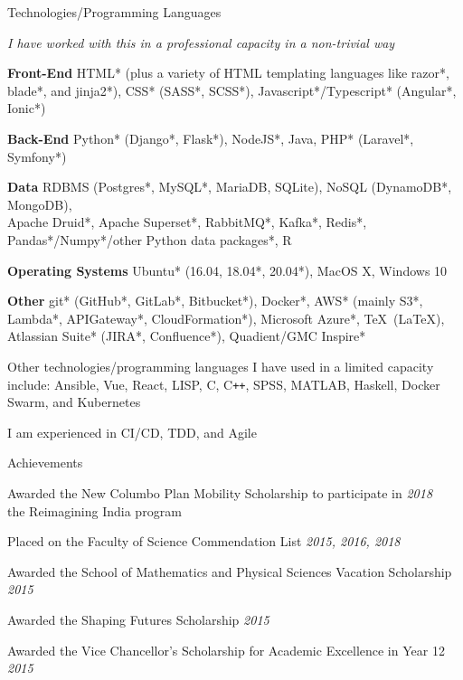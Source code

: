 \documentclass{resume} %
\begin{document}
\begin{rSection}{Technologies/Programming Languages}
    \item {\em * I have worked with this in a professional capacity in a non-trivial way}
    \item {\bf Front-End} HTML* (plus a variety of HTML templating languages like razor*,
    blade*, and jinja2*), CSS* (SASS*, SCSS*), Javascript*/Typescript* (Angular*, Ionic*)
    \item {\bf Back-End} Python* (Django*, Flask*), NodeJS*, Java, PHP* (Laravel*, Symfony*)
    \item {\bf Data} RDBMS (Postgres*, MySQL*, MariaDB, SQLite), NoSQL (DynamoDB*, MongoDB),
    \\ Apache Druid*, Apache Superset*, RabbitMQ*, Kafka*, Redis*, Pandas*/Numpy*/other Python data packages*, R
    \item {\bf Operating Systems} Ubuntu* (16.04, 18.04*, 20.04*), MacOS X, Windows 10
    \item {\bf Other} git* (GitHub*, GitLab*, Bitbucket*), Docker*, AWS* (mainly S3*, Lambda*, APIGateway*, CloudFormation*), Microsoft Azure*,
    \TeX\ (\LaTeX), Atlassian Suite* (JIRA*, Confluence*), Quadient/GMC Inspire*
    \item Other technologies/programming languages I have used in a limited capacity include:
    Ansible, Vue, React, LISP, C, C\texttt{++}, SPSS, MATLAB, Haskell, Docker Swarm, and Kubernetes
    \item I am experienced in CI/CD, TDD, and Agile
\end{rSection}


\begin{rSection}{Achievements}
    \item Awarded the New Columbo Plan Mobility Scholarship to participate in \hfill {\em 2018}
    \\ the Reimagining India program
    \item Placed on the Faculty of Science Commendation List \hfill {\em 2015, 2016, 2018}
    \item Awarded the School of Mathematics and Physical Sciences Vacation Scholarship
    \hfill {\em 2015}
    \item Awarded the Shaping Futures Scholarship \hfill {\em 2015} \
    \item Awarded the Vice Chancellor's Scholarship for Academic Excellence in Year 12 \hfill {\em 2015}
\end{rSection}
\end{document}
